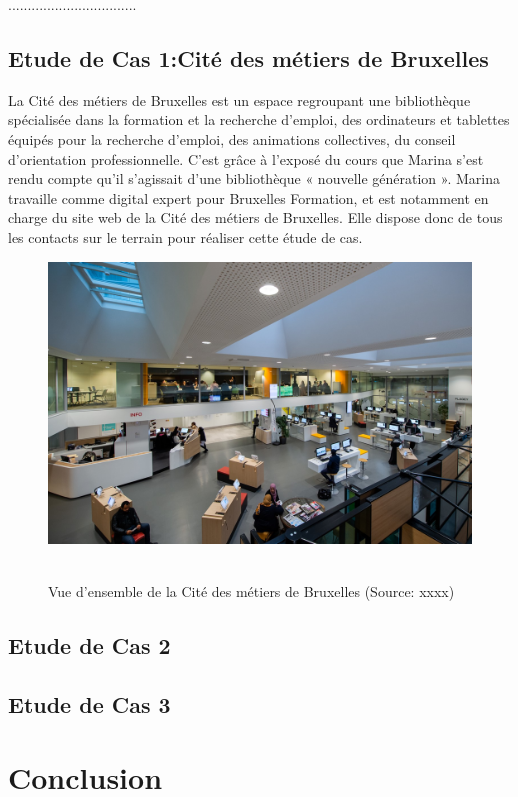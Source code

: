 \documentclass[french,a4paper,12pt]{article}
\begin{document}
.................................\\
\subsection{Etude de Cas 1:Cité des métiers de Bruxelles }
\quad La Cité des métiers de Bruxelles est un espace regroupant une bibliothèque spécialisée dans la formation et la recherche d’emploi, des ordinateurs et tablettes équipés pour la recherche d’emploi, des animations collectives, du conseil d’orientation professionnelle. C’est grâce à l’exposé du cours que Marina s’est rendu compte qu’il s’agissait d’une bibliothèque « nouvelle génération ». Marina travaille comme digital expert pour Bruxelles Formation, et est notamment en charge du site web de la Cité des métiers de Bruxelles. Elle dispose donc de tous les contacts sur le terrain pour réaliser cette étude de cas.
\begin{figure}[h]
\begin{center}
\includegraphics[scale=1]{imarina.JPG}~\\
\caption{Vue d'ensemble de la Cité des métiers de Bruxelles (Source: xxxx)}
\end{center}
\end{figure}


\newpage
\subsection{Etude de Cas 2}


\newpage
\subsection{Etude de Cas 3}

\newpage
\section{Conclusion}






\newpage
\begin{center}
\listoffigures
\end{center}

\newpage

\begin{center}

 
\end{center}
\end{document}
